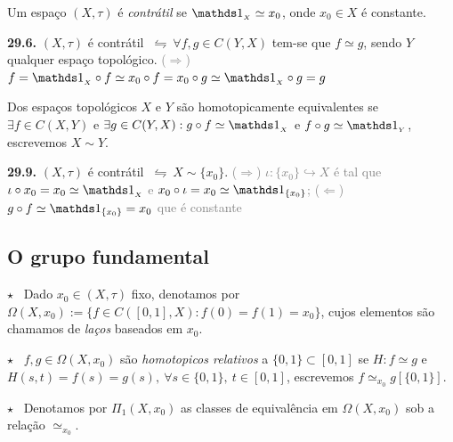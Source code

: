 \begin{definition}
    Um espaço \((X, \tau)\) é \emph{contrátil} se \(\id_{_X} \simeq x_0\), onde \(x_0 \in X\) é constante.   
\end{definition}

\begin{proposition}
    \textbf{29.6.} \((X, \tau)\) é contrátil \(\ \leftrightharpoons \ \forall f,g \in C(Y, X)\) tem-se que \(f \simeq g\), sendo \(Y\) qualquer espaço topológico.  \textcolor{gray}{(\(\Rightarrow\)) \(f = \id_{_X} \circ f \simeq x_0 \circ f = x_0 \circ g \simeq \id_{_X} \circ g = g\)}  
\end{proposition}

\begin{definition}
    Dos espaços topológicos \(X \) e \(Y\) são homotopicamente equivalentes se \(\exists f \in C(X,Y)\) e \(\exists g \in C(Y,X) : g\circ f \simeq \id_{_X}\) e \(f\circ g \simeq \id_{_Y}\), escrevemos \(X \sim Y\). 
\end{definition}

\begin{proposition}
    \textbf{29.9.} \((X,\tau)\) é contrátil \(\ \leftrightharpoons \ X \sim \{x_0\}\). \textcolor{gray}{(\(\Rightarrow\)) \(\iota:\{x_0\} \hookrightarrow X\) é tal que \(\iota \circ x_0 = x_0 \simeq \id_{_X}\) e \(x_0 \circ \iota = x_0 \simeq \id_{\{x_0\}}\); (\(\Leftarrow\)) \(g \circ f \simeq \id_{\{x_0\}} = x_0\) que é constante} 
\end{proposition}

\subsection*{O grupo fundamental}

\begin{definition}
    \(\star\) \ Dado \(x_0 \in (X, \tau)\) fixo, denotamos por \(\Omega(X, x_0):= \{f \in C([0,1], X) : f(0) = f(1) = x_0\}\), cujos elementos são chamamos de \emph{laços} baseados em \(x_0\). 

    \(\star\) \ \(f, g \in \Omega(X, x_0)\) são \emph{homotopicos relativos} a \(\{0,1\} \subset [0,1]\) se \(H: f\simeq g\) e \(H(s,t) = f(s) = g(s), \ \forall s \in \{0,1\}, \ t \in [0,1]\), escrevemos \(f\simeq_{x_0} g [\{0,1\}]\). 

    \(\star\) \ Denotamos por \(\Pi_1(X, x_0)\) as classes de equivalência em \(\Omega(X,x_0)\) sob a relação \(\simeq_{x_0}\). %
\end{definition}

